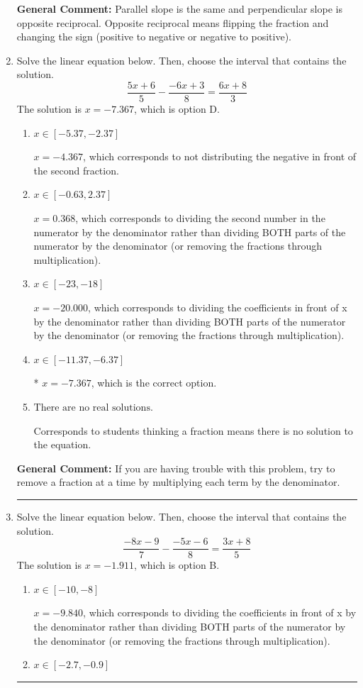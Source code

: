 \documentclass{extbook}[14pt]
\newcommand{\litem}[1]{\item #1

\rule{\textwidth}{0.4pt}}
\begin{document}
\begin{enumerate}
{\textbf{General Comment:} Parallel slope is the same and perpendicular slope is opposite reciprocal. Opposite reciprocal means flipping the fraction and changing the sign (positive to negative or negative to positive).
}
\litem{
Solve the linear equation below. Then, choose the interval that contains the solution.
\[ \frac{5x + 6}{5} - \frac{-6x + 3}{8} = \frac{6x + 8}{3} \]The solution is \( x = -7.367 \), which is option D.\begin{enumerate}[label=\Alph*.]
\item \( x \in [-5.37, -2.37] \)

 $x = -4.367$, which corresponds to not distributing the negative in front of the second fraction.
\item \( x \in [-0.63, 2.37] \)

 $x = 0.368$, which corresponds to dividing the second number in the numerator by the denominator rather than dividing BOTH parts of the numerator by the denominator (or removing the fractions through multiplication).
\item \( x \in [-23, -18] \)

 $x = -20.000$, which corresponds to dividing the coefficients in front of x by the denominator rather than dividing BOTH parts of the numerator by the denominator (or removing the fractions through multiplication).
\item \( x \in [-11.37, -6.37] \)

* $x = -7.367$, which is the correct option.
\item \( \text{There are no real solutions.} \)

Corresponds to students thinking a fraction means there is no solution to the equation.
\end{enumerate}

\textbf{General Comment:} If you are having trouble with this problem, try to remove a fraction at a time by multiplying each term by the denominator.
}
\litem{
Solve the linear equation below. Then, choose the interval that contains the solution.
\[ \frac{-8x -9}{7} - \frac{-5x -6}{8} = \frac{3x + 8}{5} \]The solution is \( x = -1.911 \), which is option B.\begin{enumerate}[label=\Alph*.]
\item \( x \in [-10, -8] \)

 $x = -9.840$, which corresponds to dividing the coefficients in front of x by the denominator rather than dividing BOTH parts of the numerator by the denominator (or removing the fractions through multiplication).
\item \( x \in [-2.7, -0.9] \)


\end{enumerate}}
\end{enumerate}
\end{document}
